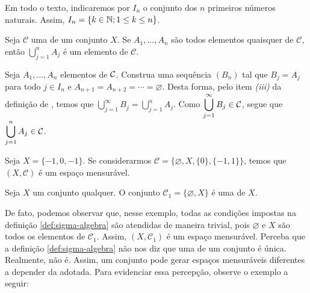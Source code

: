 \begin{remark}
	Em todo o texto, indicaremos por $I_n$ o conjunto dos $n$ primeiros números naturais. 
	Assim, $I_n = \{k \in \operatorname{\mathbb{N}}; 1 \leq k \leq n\}$.
\end{remark}

\begin{proposition}
\label{prop:sigma-união-finita}
    Seja $\mathcal{C}$ uma \sigal de um conjunto $X$. Se $A_1, ..., A_n$ são todos elementos quaisquer de $\mathcal{C}$, então $\displaystyle \bigcup_{j = 1}^n A_j$ é um elemento de $\mathcal{C}$.
\end{proposition}
\begin{prova}
	Seja $A_1,\ldots, A_n$ elementos de $\operatorname{\mathcal{C}}$. 
	Construa uma sequência $(B_n)$ tal que $B_j = A_j$ para todo $j \in I_n$ e $A_{n + 1} = A_{n + 2} = \cdots = \varnothing$.
	Desta forma, pelo item \textit{(iii)} da definição de \sigal, temos que 
	$
	\displaystyle\bigcup_{j = 1}^\infty B_j = \bigcup_{j = 1}^n A_j
	$.
	Como $\displaystyle \bigcup_{j = 1}^\infty B_j \in \operatorname{\mathcal{C}} $, segue que 
	$\displaystyle \bigcup_{j = 1}^n A_j \in \operatorname{\mathcal{C}} $.
\end{prova}

% 
 
\begin{example}
    Seja $X = \{-1,0,-1\}$. Se considerarmos $\mathcal{C} = \{\varnothing, X, \{0\}, \{-1,1\}\}$, temos que $(X, \mathcal{C})$ é um espaço mensurável.
\end{example}

\begin{example}
\label{ex:sigma-trivial}
    Seja $X$ um conjunto qualquer.
    O conjunto $\mathcal{C}_1 = \{\varnothing, X\}$ é uma \sigal de $X$.
\end{example}

De fato, podemos observar que, nesse exemplo, todas as condições impostas na definição \ref{def:sigma-algebra} são atendidas de maneira trivial, pois 
$\varnothing$ e $X$ são todos os elementos de $\mathcal{C}_1$. 
Assim,  $(X, \mathcal{C}_1)$ é um espaço mensurável.
%
Perceba que a definição \ref{def:sigma-algebra} não nos diz que uma \sigal de um conjunto é única.
Realmente, não é. 
Assim, um conjunto pode gerar espaços mensuráveis diferentes a depender da \sigal adotada.
Para evidenciar essa percepção, observe o exemplo a seguir:

